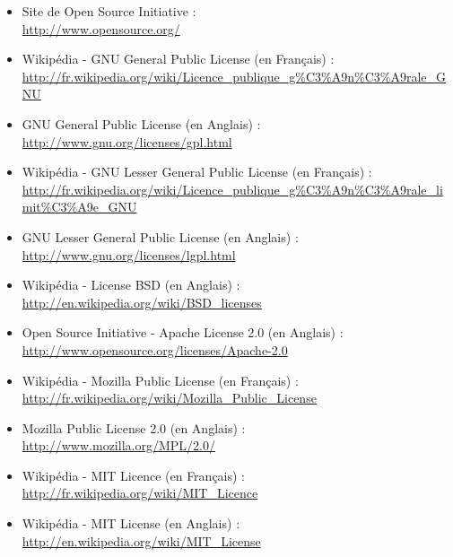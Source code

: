 \documentclass[12pt,a4paper]{article}
\begin{document}
\normalsize
\begin{itemize}
	\item Site de Open Source Initiative : \\
	\url{http://www.opensource.org/}
	\vskip3mm
	\item Wikipédia - GNU General Public License (en Fran\c{c}ais) : \\
	\url{http://fr.wikipedia.org/wiki/Licence_publique_g%C3%A9n%C3%A9rale_GNU}
	\vskip3mm
	\item GNU General Public License (en Anglais) : \\
	\url{http://www.gnu.org/licenses/gpl.html}
	\vskip3mm
	\item Wikipédia - GNU Lesser General Public License (en Fran\c{c}ais) : \\
	\url{http://fr.wikipedia.org/wiki/Licence_publique_g%C3%A9n%C3%A9rale_limit%C3%A9e_GNU}
	\vskip3mm
	\item GNU Lesser General Public License (en Anglais) : \\
	\url{http://www.gnu.org/licenses/lgpl.html}
	\vskip3mm
	\item Wikipédia - License BSD (en Anglais) : \\
	\url{http://en.wikipedia.org/wiki/BSD_licenses}
	\vskip3mm
	\item Open Source Initiative - Apache License 2.0 (en Anglais) : \\
	\url{http://www.opensource.org/licenses/Apache-2.0}
	\vskip3mm
	\item Wikipédia - Mozilla Public License (en Fran\c{c}ais) : \\
	\url{http://fr.wikipedia.org/wiki/Mozilla_Public_License}
	\vskip3mm
	\item Mozilla Public License 2.0 (en Anglais) : \\
	\url{http://www.mozilla.org/MPL/2.0/}
	\vskip3mm
	\item Wikipédia - MIT Licence (en Fran\c{c}ais) : \\
	\url{http://fr.wikipedia.org/wiki/MIT_Licence}
	\vskip3mm
	\item Wikipédia - MIT License (en Anglais) : \\
	\url{http://en.wikipedia.org/wiki/MIT_License}
	

\end{itemize}
\end{document}
